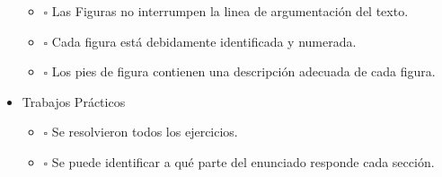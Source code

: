 \documentclass[11pt]{article}
\begin{document}
\begin{itemize}
\begin{itemize}
\item $\square$ Las Figuras no interrumpen la linea de argumentación del texto.
\item $\square$ Cada figura está debidamente identificada y numerada.
\item $\square$ Los pies de figura contienen una descripción adecuada de cada figura.
\end{itemize}
\item Trabajos Prácticos
\begin{itemize}
\item $\square$ Se resolvieron todos los ejercicios.
\item $\square$ Se puede identificar a qué parte del enunciado responde cada sección.
\end{itemize}
\end{itemize}
\end{document}
